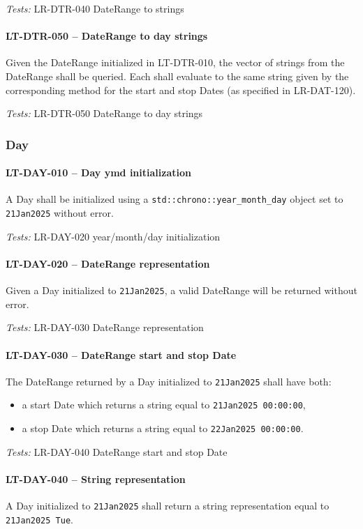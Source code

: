 \textit{Tests: } LR-DTR-040 DateRange to strings

\paragraph{LT-DTR-050 -- DateRange to day strings}
Given the DateRange initialized in LT-DTR-010, the vector of
strings from the DateRange shall be queried. Each shall evaluate
to the same string given by the corresponding method for the start and stop
Dates (as specified in LR-DAT-120).

\textit{Tests: } LR-DTR-050 DateRange to day strings

\subsubsection{Day}
\paragraph{LT-DAY-010 -- Day ymd initialization}
A Day shall be initialized using a \lstinline{std::chrono::year_month_day}
object set to \lstinline{21Jan2025} without error.

\textit{Tests: } LR-DAY-020 year/month/day initialization

\paragraph{LT-DAY-020 -- DateRange representation}
Given a Day initialized to \lstinline{21Jan2025}, a valid DateRange
will be returned without error.

\textit{Tests: } LR-DAY-030 DateRange representation

\paragraph{LT-DAY-030 -- DateRange start and stop Date}
The DateRange returned by a Day initialized to \lstinline{21Jan2025}
shall have both:
\begin{itemize}
\item a start Date which returns a string equal to
  \lstinline{21Jan2025 00:00:00},
\item a stop Date which returns a string equal to
  \lstinline{22Jan2025 00:00:00}.
\end{itemize}

\textit{Tests: } LR-DAY-040 DateRange start and stop Date

\paragraph{LT-DAY-040 -- String representation}
A Day initialized to \lstinline{21Jan2025} shall return a string
representation equal to \lstinline{21Jan2025 Tue}.

